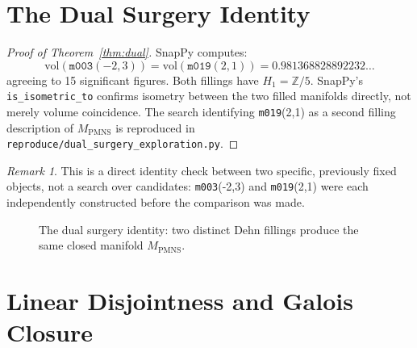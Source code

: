 \documentclass[11pt,a4paper]{article}
\theoremstyle{definition}
\theoremstyle{remark}
\newtheorem{remark}[theorem]{Remark}
\newcommand{\Z}{\mathbb{Z}}
\newcommand{\mfld}[1]{\texttt{#1}}
\newcommand{\vol}{\mathrm{vol}}
\begin{document}
\section{The Dual Surgery Identity}

\begin{proof}[Proof of Theorem~\ref{thm:dual}]
SnapPy computes:
\[
\vol(\mfld{m003}(-2,3)) = \vol(\mfld{m019}(2,1)) =
0.981368828892232\ldots
\]
agreeing to 15 significant figures. Both fillings have
$H_1=\Z/5$. SnapPy's \texttt{is\_isometric\_to} confirms isometry
between the two filled manifolds directly, not merely volume
coincidence. The search identifying \mfld{m019}(2,1) as a second
filling description of $M_{\mathrm{PMNS}}$ is reproduced in
\texttt{reproduce/dual\_surgery\_exploration.py}.
\end{proof}

\begin{remark}
This is a direct identity check between two specific, previously
fixed objects, not a search over candidates: \mfld{m003}(-2,3) and
\mfld{m019}(2,1) were each independently constructed before the
comparison was made.
\end{remark}

\begin{figure}[htbp]
\centering
{}
\caption{The dual surgery identity: two distinct Dehn fillings
produce the same closed manifold $M_{\mathrm{PMNS}}$.}
\label{fig:dual}
\end{figure}

\section{Linear Disjointness and Galois Closure}\label{sec:disjoint}
\end{document}
